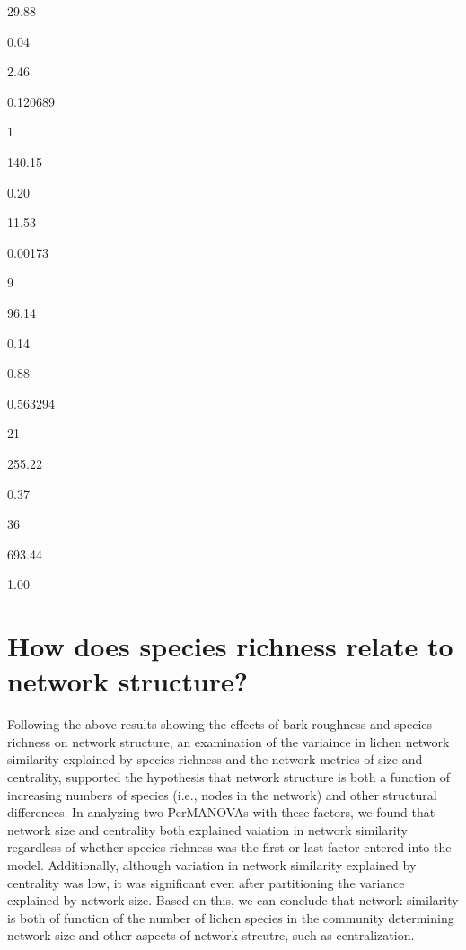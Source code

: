 \documentclass[
]{article}
\begin{document}
29.88

0.04

2.46

0.120689

1

140.15

0.20

11.53

0.00173

9

96.14

0.14

0.88

0.563294

21

255.22

0.37

36

693.44

1.00

\newpage

\section{How does species richness relate to network
structure?}\label{how-does-species-richness-relate-to-network-structure}

Following the above results showing the effects of bark roughness and
species richness on network structure, an examination of the variaince
in lichen network similarity explained by species richness and the
network metrics of size and centrality, supported the hypothesis that
network structure is both a function of increasing numbers of species
(i.e., nodes in the network) and other structural differences. In
analyzing two PerMANOVAs with these factors, we found that network size
and centrality both explained vaiation in network similarity regardless
of whether species richness was the first or last factor entered into
the model. Additionally, although variation in network similarity
explained by centrality was low, it was significant even after
partitioning the variance explained by network size. Based on this, we
can conclude that network similarity is both of function of the number
of lichen species in the community determining network size and other
aspects of network strcutre, such as centralization.
\end{document}
